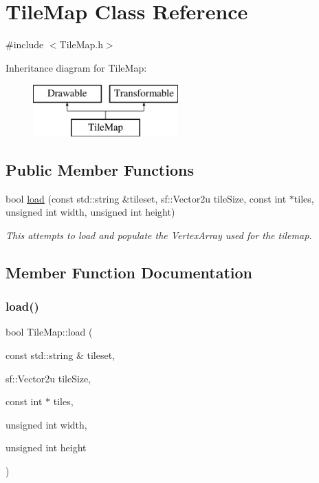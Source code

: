 \hypertarget{class_tile_map}{}\section{Tile\+Map Class Reference}
\label{class_tile_map}


{\ttfamily \#include $<$Tile\+Map.\+h$>$}

Inheritance diagram for Tile\+Map\+:\begin{figure}[H]
\begin{center}
\leavevmode
\includegraphics[height=2.000000cm]{class_tile_map}
\end{center}
\end{figure}
\subsection*{Public Member Functions}
\begin{DoxyCompactItemize}
\item 
bool \hyperlink{class_tile_map_a5bc3325e2382599c3f986ac64481e832}{load} (const std\+::string \&tileset, sf\+::\+Vector2u tile\+Size, const int $\ast$tiles, unsigned int width, unsigned int height)
\begin{DoxyCompactList}\small\item\em This attempts to load and populate the Vertex\+Array used for the tilemap. \end{DoxyCompactList}\end{DoxyCompactItemize}


\subsection{Member Function Documentation}
\mbox{\label{class_tile_map_a5bc3325e2382599c3f986ac64481e832}} 
\subsubsection{\texorpdfstring{load()}{load()}}
{\footnotesize\ttfamily bool Tile\+Map\+::load (\begin{DoxyParamCaption}\item[{const std\+::string \&}]{tileset,  }\item[{sf\+::\+Vector2u}]{tile\+Size,  }\item[{const int $\ast$}]{tiles,  }\item[{unsigned int}]{width,  }\item[{unsigned int}]{height }\end{DoxyParamCaption})}



